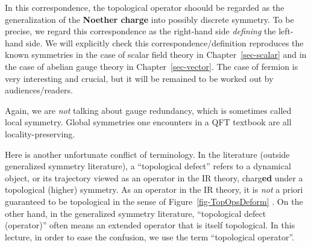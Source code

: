 \documentclass[
  letterpaper,
  DIV=11,
  numbers=noendperiod]{scrreport}
\begin{document}
In this correspondence, the topological operator shoould be regarded as
the generalization of the \textbf{Noether charge} into possibly discrete
symmetry. To be precise, we regard this correspondence as the right-hand
side \emph{defining} the left-hand side. We will explicitly check this
correspondence/definition reproduces the known symmetries in the case of
scalar field theory in Chapter~\ref{sec-scalar} and in the case of
abelian gauge theory in Chapter~\ref{sec-vector}. The case of fermion is
very interesting and crucial, but it will be remained to be worked out
by audiences/readers.

\begin{tcolorbox}[enhanced jigsaw, colframe=quarto-callout-note-color-frame, leftrule=.75mm, bottomrule=.15mm, breakable, toptitle=1mm, toprule=.15mm, coltitle=black, opacityback=0, opacitybacktitle=0.6, titlerule=0mm, colbacktitle=quarto-callout-note-color!10!white, colback=white, bottomtitle=1mm, title=\textcolor{quarto-callout-note-color}{\faInfo}\hspace{0.5em}{\textsf{Terminology (locality-preserving)}}, rightrule=.15mm, arc=.35mm, left=2mm]

Again, we are \emph{not} talking about gauge redundancy, which is
sometimes called local symmetry. Global symmetries one encounters in a
QFT textbook are all locality-preserving.

\end{tcolorbox}

\begin{tcolorbox}[enhanced jigsaw, colframe=quarto-callout-note-color-frame, leftrule=.75mm, bottomrule=.15mm, breakable, toptitle=1mm, toprule=.15mm, coltitle=black, opacityback=0, opacitybacktitle=0.6, titlerule=0mm, colbacktitle=quarto-callout-note-color!10!white, colback=white, bottomtitle=1mm, title=\textcolor{quarto-callout-note-color}{\faInfo}\hspace{0.5em}{\textsf{Terminology (topological defect)}}, rightrule=.15mm, arc=.35mm, left=2mm]

Here is another unfortunate conflict of terminology. In the literature
(outside generalized symmetry literature), a ``topological defect''
refers to a dynamical object, or its trajectory viewed as an operator in
the IR theory, charg\textbf{ed} under a topological (higher) symmetry.
As an operator in the IR theory, it is \emph{not} a priori guaranteed to
be topological in the sense of Figure~\ref{fig-TopOpsDeform} . On the
other hand, in the generalized symmetry literature, ``topological defect
(operator)'' often means an extended operator that is itself
topological. In this lecture, in order to ease the confusion, we use the
term ``topological operator''.

\end{tcolorbox}
\end{document}

